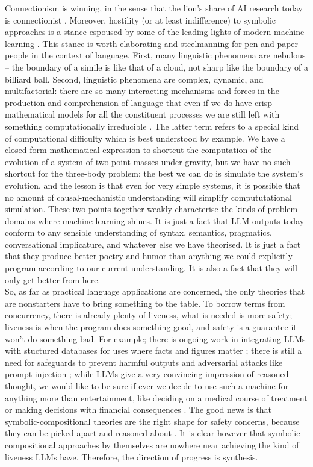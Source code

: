 Connectionism is winning, in the sense that the lion's share of AI research today is connectionist \citep{}. Moreover, hostility (or at least indifference) to symbolic approaches is a stance espoused by some of the leading lights of modern machine learning \citep{}. This stance is worth elaborating and steelmanning for pen-and-paper-people in the context of language. First, many linguistic phenomena are nebulous \citep{} -- the boundary of a simile is like that of a cloud, not sharp like the boundary of a billiard ball. Second, linguistic phenomena are complex, dynamic, and multifactorial: there are so many interacting mechanisms and forces in the production and comprehension of language that even if we do have crisp mathematical models for all the constituent processes we are still left with something computationally irreducible \citep{}. The latter term refers to a special kind of computational difficulty which is best understood by example. We have a closed-form mathematical expression to shortcut the computation of the evolution of a system of two point masses under gravity, but we have no such shortcut for the three-body problem; the best we can do is simulate the system's evolution, and the lesson is that even for very simple systems, it is possible that no amount of causal-mechanistic understanding will simplify compututational simulation. These two points together weakly characterise the kinds of problem domains where machine learning shines. It is just a fact that LLM outputs today conform to any sensible understanding of syntax, semantics, pragmatics, conversational implicature, and whatever else we have theorised. It is just a fact that they produce better poetry and humor than anything we could explicitly program according to our current understanding. It is also a fact that they will only get better from here.\\

So, as far as practical language applications are concerned, the only theories that are nonstarters have to bring something to the table. To borrow terms from concurrency, there is already plenty of liveness, what is needed is more safety; liveness is when the program does something good, and safety is a guarantee it won't do something bad. For example; there is ongoing work in integrating LLMs with stuctured databases for uses where facts and figures matter \citep{}; there is still a need for safeguards to prevent harmful outputs \citep{} and adversarial attacks like prompt injection \citep{}; while LLMs give a very convincing impression of reasoned thought, we would like to be sure if ever we decide to use such a machine for anything more than entertainment, like deciding on a medical course of treatment \citep{} or making decisions with financial consequences \citep{}. The good news is that symbolic-compositional theories are the right shape for safety concerns, because they can be picked apart and reasoned about \citep{}. It is clear however that symbolic-compositional approaches by themselves are nowhere near achieving the kind of liveness LLMs have. Therefore, the direction of progress is synthesis.\\

